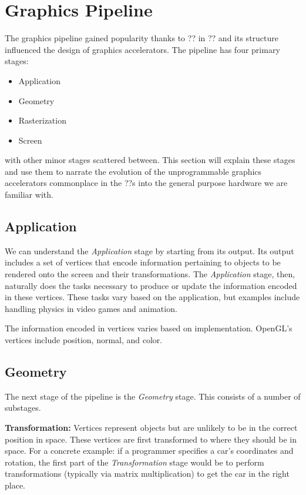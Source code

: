 \section{Graphics Pipeline}

The graphics pipeline gained popularity thanks to ?? in ?? and its structure influenced the design of graphics accelerators.
The pipeline has four primary stages:

\begin{itemize}
    \item Application
    \item Geometry
    \item Rasterization
    \item Screen
\end{itemize}

with other minor stages scattered between.
This section will explain these stages and use them to narrate the evolution of the unprogrammable graphics accelerators commonplace in the ??s into the general purpose hardware we are familiar with.

\subsection{Application}

We can understand the \textit{Application} stage by starting from its output.
Its output includes a set of vertices that encode information pertaining to objects to be rendered onto the screen and their transformations.
The \textit{Application} stage, then, naturally does the tasks necessary to produce or update the information encoded in these vertices.
These tasks vary based on the application, but examples include handling physics in video games and animation.

The information encoded in vertices varies based on implementation. OpenGL's vertices include position, normal, and color.

\subsection{Geometry}

The next stage of the pipeline is the \textit{Geometry} stage. 
This consists of a number of substages.

\textbf{Transformation:}
Vertices represent objects but are unlikely to be in the correct position in space.
These vertices are first transformed to where they should be in space.
For a concrete example: if a programmer specifies a car's coordinates and
rotation, the first part of the \textit{Transformation} stage would be to perform
transformations (typically via matrix multiplication) to get the car in the
right place.

